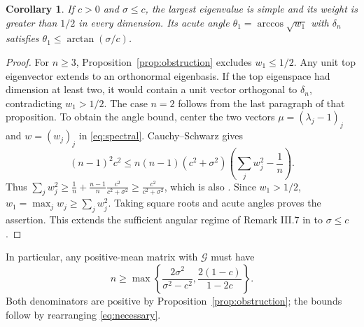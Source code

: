 \documentclass[11pt]{article}
\newtheorem{corollary}[theorem]{Corollary}
\newcommand{\G}{\mathcal G}
\begin{document}
\begin{corollary}\label{cor:majority}
If $c>0$ and $\sigma\le c$, the largest eigenvalue is simple and its
weight is greater than $1/2$ in every dimension. Its acute angle
$\theta_1=\arccos\sqrt{w_1}$ with $\delta_n$ satisfies
$\theta_1\le\arctan(\sigma/c)$.
\end{corollary}
\begin{proof}
For $n\ge3$, Proposition~\ref{prop:obstruction} excludes $w_1\le1/2$.
Any unit top eigenvector extends to an orthonormal eigenbasis. If the
top eigenspace had dimension at least two, it would contain a unit
vector orthogonal to $\delta_n$, contradicting $w_1>1/2$.
The case $n=2$ follows from the last paragraph of that proposition.
To obtain the angle bound, center the two vectors
$\mu=(\lambda_j-1)_j$ and $w=(w_j)_j$ in \eqref{eq:spectral}.
Cauchy--Schwarz gives
\[
 (n-1)^2c^2\le n(n-1)(c^2+\sigma^2)
 \left(\sum_jw_j^2-\frac1n\right).
\]
Thus $\sum_jw_j^2\ge \frac1n+\frac{n-1}{n}
\frac{c^2}{c^2+\sigma^2}\ge\frac{c^2}{c^2+\sigma^2}$,
which is also \cite[Eq.~(IV.17)]{SHG}.
Since $w_1>1/2$, $w_1=\max_jw_j\ge\sum_jw_j^2$.
Taking square roots and acute angles proves the assertion.
This extends the sufficient angular regime of Remark III.7
in \cite[p.~8]{SHG} to $\sigma\le c$.
\end{proof}

In particular, any positive-mean matrix with $\G$ must have
\[
 n\ge\max\left\{\frac{2\sigma^2}{\sigma^2-c^2},
                   \frac{2(1-c)}{1-2c}\right\}.
\]
Both denominators are positive by Proposition~\ref{prop:obstruction};
the bounds follow by rearranging \eqref{eq:necessary}.
\end{document}
